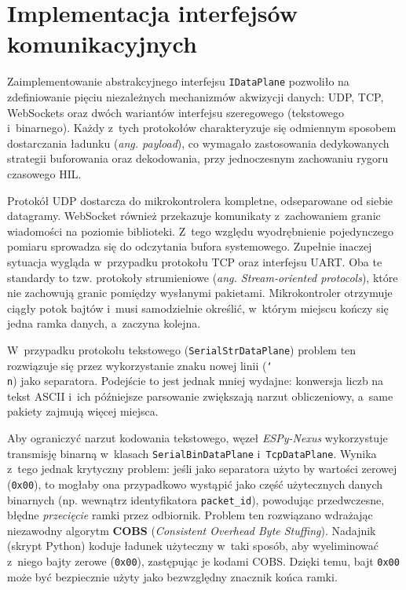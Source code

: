 \section{Implementacja interfejsów komunikacyjnych}
\label{sec:interfejsy_komunikacyjne}

Zaimplementowanie abstrakcyjnego interfejsu \texttt{IDataPlane} pozwoliło na zdefiniowanie pięciu niezależnych mechanizmów akwizycji danych: UDP, TCP, WebSockets oraz dwóch wariantów interfejsu szeregowego (tekstowego i~binarnego).
Każdy z~tych protokołów charakteryzuje się odmiennym sposobem dostarczania ładunku (\textit{ang. payload}), co wymagało zastosowania dedykowanych strategii buforowania oraz dekodowania, przy jednoczesnym zachowaniu rygoru czasowego HIL.

Protokół UDP dostarcza do mikrokontrolera kompletne, odseparowane od siebie datagramy. WebSocket również przekazuje komunikaty z~zachowaniem granic wiadomości na poziomie biblioteki.
Z~tego względu wyodrębnienie pojedynczego pomiaru sprowadza się do odczytania bufora systemowego.
Zupełnie inaczej sytuacja wygląda w~przypadku protokołu TCP oraz interfejsu UART.
Oba te standardy to tzw. protokoły strumieniowe (\textit{ang. Stream-oriented protocols}), które nie zachowują granic pomiędzy wysłanymi pakietami.
Mikrokontroler otrzymuje ciągły potok bajtów i~musi samodzielnie określić, w~którym miejscu kończy się jedna ramka danych, a~zaczyna kolejna.

W~przypadku protokołu tekstowego (\texttt{SerialStrDataPlane}) problem ten rozwiązuje się przez wykorzystanie znaku nowej linii (\texttt{\char`\\n}) jako separatora. Podejście to jest jednak mniej wydajne: konwersja liczb na tekst ASCII i~ich późniejsze parsowanie zwiększają narzut obliczeniowy, a~same pakiety zajmują więcej miejsca.

Aby ograniczyć narzut kodowania tekstowego, węzeł \textit{ESPy-Nexus} wykorzystuje transmisję binarną w~klasach \texttt{SerialBinDataPlane} i~\texttt{TcpDataPlane}.
Wynika z~tego jednak krytyczny problem: jeśli jako separatora użyto by wartości zerowej (\texttt{0x00}), to mogłaby ona przypadkowo wystąpić jako część użytecznych danych binarnych (np. wewnątrz identyfikatora \texttt{packet\_id}), powodując przedwczesne, błędne \textit{przecięcie} ramki przez odbiornik.
Problem ten rozwiązano wdrażając niezawodny algorytm \textbf{COBS} (\textit{Consistent Overhead Byte Stuffing}).
Nadajnik (skrypt Python) koduje ładunek użyteczny w~taki sposób, aby wyeliminować z~niego bajty zerowe (\texttt{0x00}), zastępując je kodami COBS.
Dzięki temu, bajt \texttt{0x00} może być bezpiecznie użyty jako bezwzględny znacznik końca ramki.

